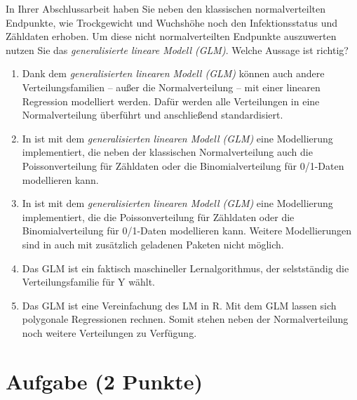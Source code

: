 \documentclass[a4paper, 9pt]{scrartcl}\usepackage[]{graphicx}\usepackage[]{xcolor}
\begin{document}
In Ihrer Abschlussarbeit haben Sie neben den klassischen normalverteilten Endpunkte, wie Trockgewicht und Wuchshöhe noch den Infektionsstatus und Zähldaten erhoben. Um diese nicht normalverteilten Endpunkte auszuwerten nutzen Sie das \textit{generalisierte lineare Modell (GLM)}. Welche Aussage ist richtig?




\begin{enumerate}
\item [\textbf{A} \msquare] Dank dem \textit{generalisierten linearen Modell (GLM)} können auch andere Verteilungsfamilien -- außer die Normalverteilung -- mit einer linearen Regression modelliert werden. Dafür werden alle Verteilungen in eine Normalverteilung überführt und anschließend standardisiert.
\item [\textbf{B} \msquare] In \Rlogo ist mit dem \textit{generalisierten linearen Modell (GLM)} eine Modellierung implementiert, die neben der klassischen Normalverteilung auch die Poissonverteilung für Zähldaten oder die Binomialverteilung für 0/1-Daten modellieren kann.
\item [\textbf{C} \msquare] In \Rlogo ist mit dem \textit{generalisierten linearen Modell (GLM)} eine Modellierung implementiert, die die Poissonverteilung für Zähldaten oder die Binomialverteilung für 0/1-Daten modellieren kann. Weitere Modellierungen sind in \Rlogo auch mit zusätzlich geladenen Paketen nicht möglich.
\item [\textbf{D} \msquare] Das GLM ist ein faktisch maschineller Lernalgorithmus, der selstständig die Verteilungsfamilie für Y wählt.
\item [\textbf{E} \msquare] Das GLM ist eine Vereinfachung des LM in R. Mit dem GLM lassen sich polygonale Regressionen rechnen. Somit stehen neben der Normalverteilung noch weitere Verteilungen zu Verfügung.
\end{enumerate}

\section{Aufgabe \hfill (2 Punkte)}

\ifcollection
\begin{flushright}
\tiny\vspace{-2Ex}
\textbf{\examinhaltstart}
\exammodulebiostat
\vspace{-1Ex}
\end{flushright}
\fi
\end{document}
